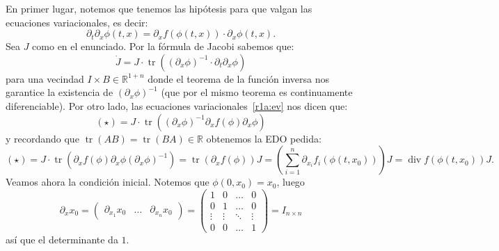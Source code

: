 \documentclass[10pt]{article}
\DeclareMathOperator\Div{div}
\DeclareMathOperator\tr{tr}
\begin{document}
\begin{plist}
\item En primer lugar, notemos que tenemos las hipótesis para que valgan las
ecuaciones variacionales, es decir:
\[\label{r1a:ev}
    \partial_t \partial_x \phi(t,x)
    =
    \partial_x f(\phi(t,x)) \cdot \partial_x \phi(t,x)
    \tag{EV}
.\]
Sea \(J\) como en el enunciado. Por la fórmula de Jacobi sabemos que:
\[
    \dot{J}
    =
    J \cdot \tr \left(
        (\partial_x \phi)^{-1}
        \cdot
        \partial_t \partial_x \phi
    \right)
    \tag{\(\star\)}
\]
para una vecindad \(I\times B\in \mathbb{R}^{1+n}\) donde el teorema de la
función inversa nos
garantice la existencia de \((\partial_x \phi)^{-1}\) (que por el mismo teorema
es continuamente diferenciable). Por otro lado, las ecuaciones
variacionales~\eqref{r1a:ev} nos dicen que:
\[
    (\star)
    =
    J \cdot \tr \left(
        (\partial_x \phi)^{-1}
        \partial_x f(\phi)
        \partial_x \phi
    \right)
\]
y recordando que \(\tr(AB) = \tr(BA) \in \mathbb{R}\) obtenemos la EDO pedida:
\[
    (\star)
    =
    J \cdot \tr \left(
        \partial_x f(\phi)
        \partial_x \phi
        (\partial_x \phi)^{-1}
    \right)
    =
    \tr \left(\partial_x f(\phi) \right)
    J
    =
    \left(\sum_{i=1}^{n} \partial_{x_i} f_i(\phi(t,x_0))\right)
    J
    =
    \Div f(\phi(t,x_0)) J
.\]
Veamos ahora la condición inicial. Notemos que \(\phi(0,x_0) = x_0\), luego
\[
    \partial_x x_0
    =
    \begin{pmatrix}
        \partial_{x_1} x_0 & \dots & \partial_{x_n} x_0
    \end{pmatrix}
    =
    \begin{pmatrix}
    1 & 0 & \dots & 0\\
    0 & 1 & \dots & 0\\
    \vdots & \vdots & \ddots & \vdots\\
    0 & 0 & \dots & 1
    \end{pmatrix}
    =
    I_{n\times n}
\]
así que el determinante da \(1\).

\item
\end{plist}
\end{document}
